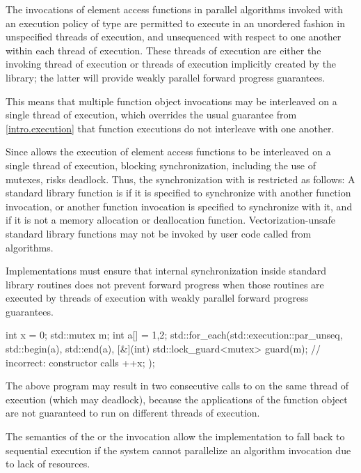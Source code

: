 \pnum
The invocations of element access functions in parallel algorithms invoked with
an execution policy of type  are
permitted to execute in an unordered fashion in unspecified threads of execution, and
unsequenced with respect to one another within each thread of execution.
These threads of execution are either the invoking thread of execution or threads of
execution implicitly created by the library; the latter will provide weakly parallel
forward progress guarantees. 
\begin{note}
This means that multiple function object invocations may be interleaved on a
single thread of execution, which overrides the usual guarantee from \ref{intro.execution}
that function executions do not interleave with one another.
\end{note}
Since  allows the execution of element
access functions to be interleaved on a single thread of execution, blocking synchronization,
including the use of mutexes, risks deadlock. Thus, the synchronization with
 is restricted as
follows:
A standard library function is  if it is specified
to synchronize with another function invocation, or another function invocation
is specified to synchronize with it, and if it is not a memory allocation or
deallocation function. Vectorization-unsafe standard library functions may not
be invoked by user code called from 
algorithms.
\begin{note}
Implementations must ensure that internal synchronization inside standard
library routines does not prevent forward progress when those routines are
executed by threads of execution with weakly parallel forward progress guarantees.
\end{note}
\begin{example}
\begin{codeblock}
int x = 0;
std::mutex m;
int a[] = {1,2};
std::for_each(std::execution::par_unseq, std::begin(a), std::end(a), [&](int) {
  std::lock_guard<mutex> guard(m); // incorrect:  constructor calls 
  ++x;
});
\end{codeblock}
The above program may result in two consecutive calls to  on
the same thread of execution (which may deadlock), because the applications of the function
object are not guaranteed to run on different threads of execution.
\end{example}
\begin{note}
The semantics of the  or the
 invocation allow the implementation to
fall back to sequential execution if the system cannot parallelize an algorithm
invocation due to lack of resources.
\end{note}

